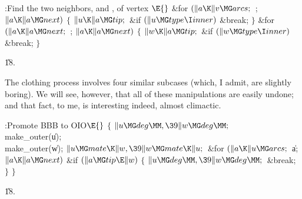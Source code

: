 \B{}:Find the two neighbors,  and , of
vertex \X${}\E{}$\6
\&{for} ${}(\|a\K\|v\MG\\{arcs};{}$  ; ${}\|a\K\|a\MG\\{next}){}$\5
${}\{{}$\1\6
${}\|u\K\|a\MG\\{tip};{}$\6
\&{if} ${}(\|u\MG\\{type}\I\\{inner}){}$\1\5
\&{break};\2\6
\4${}\}{}$\2\6
\&{for} ${}(\|a\K\|a\MG\\{next};{}$  ; ${}\|a\K\|a\MG\\{next}){}$\5
${}\{{}$\1\6
${}\|w\K\|a\MG\\{tip};{}$\6
\&{if} ${}(\|w\MG\\{type}\I\\{inner}){}$\1\5
\&{break};\2\6
\4${}\}{}$\2\par
\U18.\fi

The clothing process involves four similar subcases
(which, I admit,
are slightly boring). We will see, however, that all of these manipulations
are easily undone; and that fact, to me, is interesting indeed, almost
climactic.

\Y\B\4:Promote BBB to OIO\X${}\E{}$\6
${}\{{}$\1\6
${}\|u\MG\\{deg}\MM,\39\|w\MG\\{deg}\MM;{}$\6
\\{make\_outer}(\|u);\6
\\{make\_outer}(\|w);\6
${}\|u\MG\\{mate}\K\|w,\39\|w\MG\\{mate}\K\|u;{}$\6
\&{for} ${}(\|a\K\|u\MG\\{arcs};{}$ \|a; ${}\|a\K\|a\MG\\{next}){}$\1\6
\&{if} ${}(\|a\MG\\{tip}\E\|w){}$\5
${}\{{}$\1\6
${}\|u\MG\\{deg}\MM,\39\|w\MG\\{deg}\MM;{}$\6
\&{break};\6
\4${}\}{}$\2\2\6
\4${}\}{}$\2\par
\U18.\fi

